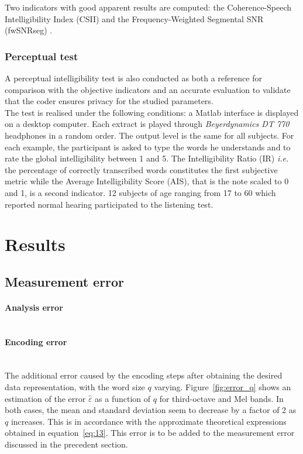 \documentclass[12pt,times,onecolumn]{article}
\begin{document}
Two indicators with good apparent results are computed: the Coherence-Speech Intelligibility Index (CSII) \cite{kates2005} and the Frequency-Weighted Segmental SNR (fwSNRseg) \cite{hu2008}.


\subsubsection{Perceptual test}
A perceptual intelligibility test is also conducted as both a reference for comparison with the objective indicators and an accurate evaluation to validate that the coder ensures privacy for the studied parameters.\\

The test is realised under the following conditions: a Matlab interface is displayed on a desktop computer. Each extract is played through \textit{Beyerdynamics DT 770} headphones in a random order. The output level is the same for all subjects. For each example, the participant is asked to type the words he understands and to rate the global intelligibility between 1 and 5. The Intelligibility Ratio (IR) \textit{i.e.} the percentage of correctly transcribed words constitutes the first subjective metric while the Average Intelligibility Score (AIS), that is the note scaled to 0 and 1, is a second indicator. 12 subjects of age ranging from 17 to 60 which reported normal hearing participated to the listening test.


\section{Results}
\subsection{Measurement error}
\paragraph{Analysis error\\\\}

\paragraph{Encoding error\\\\}
The additional error caused by the encoding steps after obtaining the desired data representation, with the word size $q$ varying. Figure~\ref{fig:error_q} shows an estimation of the error $\hat{\varepsilon}$ as a function of $q$ for third-octave and Mel bands. In both cases, the mean and standard deviation seem to decrease by a factor of 2 as $q$ increases. This is in accordance with the approximate theoretical expressions obtained in equation~\ref{eq:13}. This error is to be added to the measurement error discussed in the precedent section.
\end{document}
